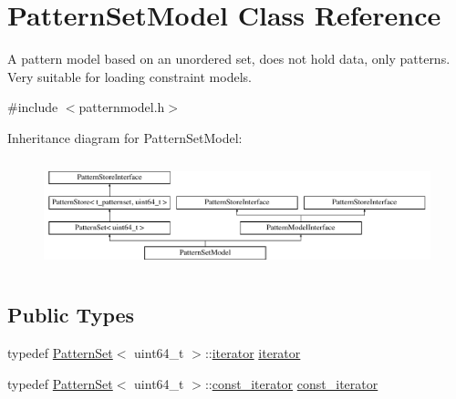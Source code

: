 \hypertarget{classPatternSetModel}{}\section{Pattern\+Set\+Model Class Reference}
\label{classPatternSetModel}


A pattern model based on an unordered set, does not hold data, only patterns. Very suitable for loading constraint models.  




{\ttfamily \#include $<$patternmodel.\+h$>$}

Inheritance diagram for Pattern\+Set\+Model\+:\begin{figure}[H]
\begin{center}
\leavevmode
\includegraphics[height=3.218391cm]{classPatternSetModel}
\end{center}
\end{figure}
\subsection*{Public Types}
\begin{DoxyCompactItemize}
\item 
typedef \hyperlink{classPatternSet}{Pattern\+Set}$<$ uint64\+\_\+t $>$\+::\hyperlink{classPatternSetModel_a59468751dd558f75f6ddaa514b93ff07}{iterator} \hyperlink{classPatternSetModel_a59468751dd558f75f6ddaa514b93ff07}{iterator}
\item 
typedef \hyperlink{classPatternSet}{Pattern\+Set}$<$ uint64\+\_\+t $>$\+::\hyperlink{classPatternSetModel_aca006659665c67916ea64d89b16a46e4}{const\+\_\+iterator} \hyperlink{classPatternSetModel_aca006659665c67916ea64d89b16a46e4}{const\+\_\+iterator}
\end{DoxyCompactItemize}
